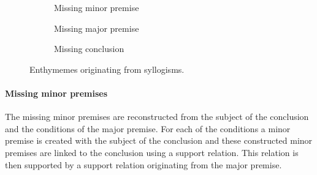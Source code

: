 \begin{figure}[ht!]
    \centering
    \begin{subfigure}[b]{0.3\textwidth}
        \centering
        \caption{Missing minor premise}
        \label{fig:missingminor}
    \end{subfigure}
    \begin{subfigure}[b]{0.3\textwidth}
        \centering
        \caption{Missing major premise}
        \label{fig:missingmajor}
    \end{subfigure}
    \begin{subfigure}[b]{0.3\textwidth}
        \centering
        \caption{Missing conclusion}
        \label{fig:missingconclusion}
    \end{subfigure}
    \caption{Enthymemes originating from syllogisms.}
    \label{fig:enthymemes}
\end{figure}

\paragraph{Missing minor premises}
The missing minor premises are reconstructed from the subject of the conclusion and the conditions of the major premise. For each of the conditions a minor premise is created with the subject of the conclusion and these constructed minor premises are linked to the conclusion using a support relation. This relation is then supported by a support relation originating from the major premise.

